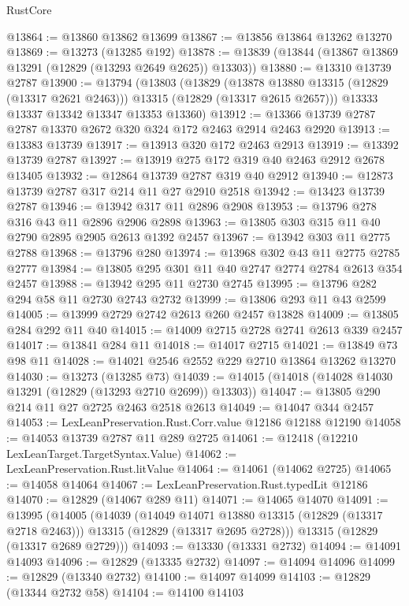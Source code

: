 \begin{lexlean}{RustCore}
\begin{coremodule}
@13864 := @13860 @13862 @13699
@13867 := @13856 @13864 @13262 @13270
@13869 := @13273 (@13285 @192)
@13878 := @13839 (@13844 (@13867 @13869 @13291 (@12829 (@13293 @2649 @2625)) @13303))
@13880 := @13310 @13739 @2787
@13900 := @13794
    (@13803
      (@13829
        (@13878 @13880 @13315 (@12829 (@13317 @2621 @2463)))
        @13315
        (@12829 (@13317 @2615 @2657)))
      @13333
      @13337
      @13342
      @13347
      @13353
      @13360)
@13912 := @13366 @13739 @2787 @2787 @13370 @2672 @320 @324 @172 @2463 @2914 @2463 @2920
@13913 := @13383 @13739
@13917 := @13913 @320 @172 @2463 @2913
@13919 := @13392 @13739 @2787
@13927 := @13919 @275 @172 @319 @40 @2463 @2912 @2678 @13405
@13932 := @12864 @13739 @2787 @319 @40 @2912
@13940 := @12873 @13739 @2787 @317 @214 @11 @27 @2910 @2518
@13942 := @13423 @13739 @2787
@13946 := @13942 @317 @11 @2896 @2908
@13953 := @13796 @278 @316 @43 @11 @2896 @2906 @2898
@13963 := @13805 @303 @315 @11 @40 @2790 @2895 @2905 @2613 @1392 @2457
@13967 := @13942 @303 @11 @2775 @2788
@13968 := @13796 @280
@13974 := @13968 @302 @43 @11 @2775 @2785 @2777
@13984 := @13805 @295 @301 @11 @40 @2747 @2774 @2784 @2613 @354 @2457
@13988 := @13942 @295 @11 @2730 @2745
@13995 := @13796 @282 @294 @58 @11 @2730 @2743 @2732
@13999 := @13806 @293 @11 @43 @2599
@14005 := @13999 @2729 @2742 @2613 @260 @2457 @13828
@14009 := @13805 @284 @292 @11 @40
@14015 := @14009 @2715 @2728 @2741 @2613 @339 @2457
@14017 := @13841 @284 @11
@14018 := @14017 @2715
@14021 := @13849 @73 @98 @11
@14028 := @14021 @2546 @2552 @229 @2710 @13864 @13262 @13270
@14030 := @13273 (@13285 @73)
@14039 := @14015 (@14018 (@14028 @14030 @13291 (@12829 (@13293 @2710 @2699)) @13303))
@14047 := @13805 @290 @214 @11 @27 @2725 @2463 @2518 @2613
@14049 := @14047 @344 @2457
@14053 := LexLeanPreservation.Rust.Corr.value @12186 @12188 @12190
@14058 := @14053 @13739 @2787 @11 @289 @2725
@14061 := @12418 (@12210 LexLeanTarget.TargetSyntax.Value)
@14062 := LexLeanPreservation.Rust.litValue
@14064 := @14061 (@14062 @2725)
@14065 := @14058 @14064
@14067 := LexLeanPreservation.Rust.typedLit @12186
@14070 := @12829 (@14067 @289 @11)
@14071 := @14065 @14070
@14091 := @13995
    (@14005
      (@14039
        (@14049 @14071 @13880 @13315 (@12829 (@13317 @2718 @2463)))
        @13315
        (@12829 (@13317 @2695 @2728)))
      @13315
      (@12829 (@13317 @2689 @2729)))
@14093 := @13330 (@13331 @2732)
@14094 := @14091 @14093
@14096 := @12829 (@13335 @2732)
@14097 := @14094 @14096
@14099 := @12829 (@13340 @2732)
@14100 := @14097 @14099
@14103 := @12829 (@13344 @2732 @58)
@14104 := @14100 @14103

\end{coremodule}
\end{lexlean}
